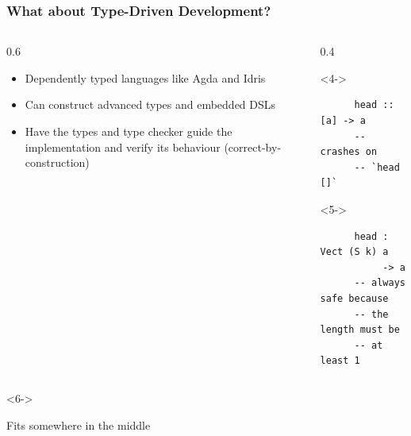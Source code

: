 \documentclass[compress]{beamer}
\begin{document}
\begin{frame}[fragile]
\begin{tikzpicture}[> = stealth, semithick]
  \end{tikzpicture}

\end{frame}


\begin{frame}[fragile]
  \frametitle{What about Type-Driven Development?}

  \large

  \begin{columns}
  \begin{column}{0.6\framewidth}
    \begin{itemize}
      \item<1-> Dependently typed languages like Agda and Idris
      \item<2-> Can construct advanced types and embedded DSLs
      \item<3-> Have the types and type checker guide the implementation and
                verify its behaviour (correct-by-construction)
    \end{itemize}
  \end{column}
  \begin{column}{0.4\framewidth}
    \begin{onlyenv}<4->
    \begin{verbatim}
      head :: [a] -> a
      -- crashes on
      -- `head []`
    \end{verbatim}
    \end{onlyenv}

    \vspace*{3mm}

    \begin{onlyenv}<5->
    \begin{verbatim}
      head :  Vect (S k) a
           -> a
      -- always safe because
      -- the length must be
      -- at least 1
    \end{verbatim}
    \end{onlyenv}
  \end{column}
  \end{columns}

  \vspace*{2mm}
  \begin{onlyenv}<6->
  \begin{center}
    \large
    Fits somewhere in the middle
  \end{center}
  \vspace*{-12mm}
  \end{onlyenv}

\end{frame}
\end{document}
